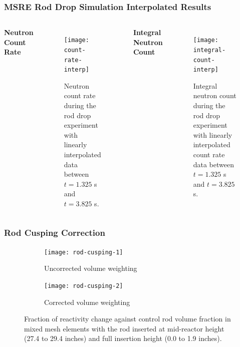\begin{frame}[noframenumbering]
  \frametitle{MSRE Rod Drop Simulation Interpolated Results}
  \begin{columns}
    \column{5.5cm}
    \centerline{\large \textbf{Neutron Count Rate}}
    \begin{figure}[t]
      \centering
      \texttt{[image: count-rate-interp]}
      \caption{Neutron count rate during the rod drop experiment with linearly
      interpolated data between $t=1.325$ s and $t=3.825$ s.}
      \label{fig:count-rate}
    \end{figure}
    \column{5.5cm}
    \centerline{\large \textbf{Integral Neutron Count}}
    \begin{figure}[t]
      \centering
      \texttt{[image: integral-count-interp]}
      \caption{Integral neutron count during the rod drop experiment with linearly interpolated
      count rate data between $t=1.325$ s and $t=3.825$ s.}
      \label{fig:count-rate}
    \end{figure}
  \end{columns}
\end{frame}

\begin{frame}[noframenumbering]
  \frametitle{Rod Cusping Correction}
  \begin{figure}[t]
      \centering
      \begin{subfigure}[t]{.49\textwidth}
          \centering
          \texttt{[image: rod-cusping-1]}
          \caption{Uncorrected volume weighting}
          \label{fig:rod-cusping-1}
      \end{subfigure}
      \hfill
      \begin{subfigure}[t]{.49\textwidth}
          \centering
          \texttt{[image: rod-cusping-2]}
          \caption{Corrected volume weighting}
          \label{fig:rod-cusping-2}
      \end{subfigure}
      \caption{Fraction of reactivity change against control rod volume fraction in mixed mesh
      elements with the rod inserted at mid-reactor height (27.4 to 29.4 inches) and full insertion
      height (0.0 to 1.9 inches).}
      \label{fig:rod-cusping}
  \end{figure}
\end{frame}

